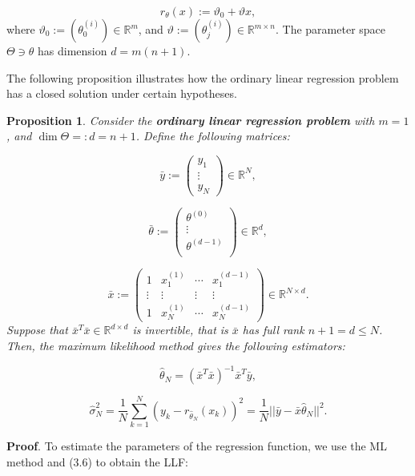 \documentclass{report}
\newtheorem{proposition}{Proposition}[chapter]
\begin{document}
\begin{equation}
r_\theta(x) :=  \vartheta_0 + \vartheta x,
\end{equation}
where $\vartheta_0 := (\theta_0^{(i)}) \in \mathbb{R}^m$, and $\vartheta := (\theta_j^{(i)}) \in \mathbb{R}^{m \times n}$. The parameter space $\Theta \ni \theta$ has dimension $d = m(n+1)$.

The following proposition illustrates how the ordinary linear regression problem has a closed solution under certain hypotheses.

\begin{proposition}
Consider the \textbf{ordinary linear regression problem} with $m=1$, and $\dim \Theta =: d = n + 1$. Define the following matrices:

\begin{equation}
\bar{y} := \begin{pmatrix}y_1\\
\vdots\\
y_N
\end{pmatrix} \in \mathbb{R}^N,
\end{equation}

\begin{equation}
\bar{\theta} := \begin{pmatrix}\theta^{(0)}\\
\vdots\\
\theta^{(d-1)}\\
\end{pmatrix} \in \mathbb{R}^{d},
\end{equation}

\begin{equation}
\bar{x} := \begin{pmatrix}
1 & x^{(1)}_1 & \cdots & x^{(d-1)}_1\\
\vdots & \vdots  & \vdots & \vdots \\
1 & x^{(1)}_N  &\cdots & x^{(d-1)}_N
\end{pmatrix} \in \mathbb{R}^{N \times d}.
\end{equation}
Suppose that $\bar{x}^T\bar{x} \in \mathbb{R}^{d \times d}$ is invertible, that is $\bar{x}$ has full rank $n + 1 = d \leq N$. Then, the maximum likelihood method gives the following estimators:

\begin{equation}
\hat{\theta}_N = (\bar{x}^T\bar{x})^{-1}\bar{x}^T\bar{y},
\end{equation}

\begin{equation}
\hat{\sigma}_N^2 = \frac{1}{N}\sum_{k=1}^{N}(y_k-r_{\hat{\theta}_N}(x_k))^2 = \frac{1}{N}||\bar{y} -\bar{x}\hat{\theta}_N||^2.
\end{equation}
\end{proposition}
\textbf{Proof}. To estimate the parameters of the regression function, we use the ML method and (3.6) to obtain the LLF:
\end{document}
